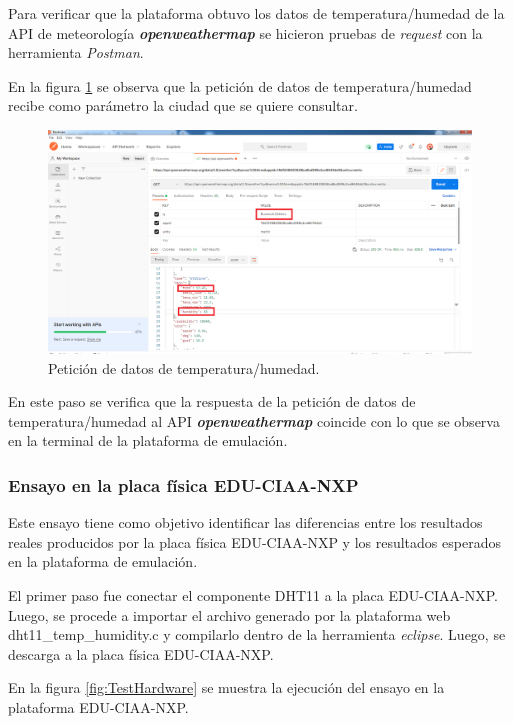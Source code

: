Para verificar que la plataforma obtuvo los datos de temperatura/humedad de la API de meteorología \textit{\textbf{openweathermap}} se hicieron pruebas de \textit{request} con la herramienta \textit{Postman}.

En la figura \ref{fig:RespuestaPostMan1} se observa que la petición de datos de temperatura/humedad recibe como parámetro la ciudad que se quiere consultar.

\begin{figure}[ht]
	\centering
	\includegraphics[scale=.30]{./Figures/RespuestaPostMan1.png}
	\caption{Petición de datos de temperatura/humedad.}
	\label{fig:RespuestaPostMan1}
\end{figure}

En este paso se verifica que la respuesta de la petición de datos de temperatura/humedad al API \textit{\textbf{openweathermap}} coincide con lo que se observa en la terminal de la plataforma de emulación.

\subsubsection{Ensayo en la placa física EDU-CIAA-NXP} 

Este ensayo tiene como objetivo identificar las diferencias entre los resultados reales producidos por la placa física EDU-CIAA-NXP y los resultados esperados en la plataforma de emulación.

El primer paso fue conectar el componente DHT11 a la placa EDU-CIAA-NXP. Luego, se procede a importar el archivo generado por la plataforma web \newline\textquotedbl dht11\_temp\_humidity.c\textquotedbl{} y compilarlo dentro de la herramienta 
\textit{eclipse}. Luego, se descarga a la placa física EDU-CIAA-NXP.

En la figura \ref{fig:TestHardware} se muestra la ejecución del ensayo en la plataforma EDU-CIAA-NXP.

